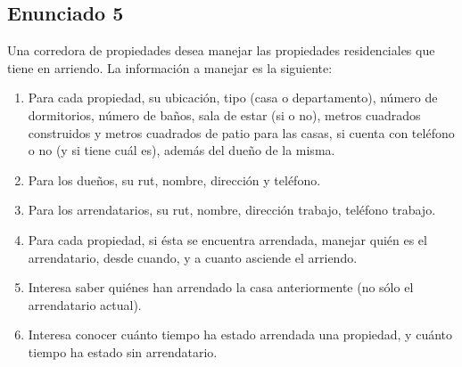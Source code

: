 \documentclass{templateNote}
\begin{document}
\subsection{Enunciado 5}
Una corredora de propiedades desea manejar las propiedades residenciales que tiene en arriendo.
La información a manejar es la siguiente:
\begin{enumerate}
    \item Para cada propiedad, su ubicación, tipo (casa o departamento), número de dormitorios, número
    de baños, sala de estar (si o no), metros cuadrados construidos y metros cuadrados de patio para
    las casas, si cuenta con teléfono o no (y si tiene cuál es), además del dueño de la misma.
    \item Para los dueños, su rut, nombre, dirección y teléfono.
    \item Para los arrendatarios, su rut, nombre, dirección trabajo, teléfono trabajo.
    \item Para cada propiedad, si ésta se encuentra arrendada, manejar quién es el arrendatario, desde
    cuando, y a cuanto asciende el arriendo.
    \item Interesa saber quiénes han arrendado la casa anteriormente (no sólo el arrendatario actual).
    \item Interesa conocer cuánto tiempo ha estado arrendada una propiedad, y cuánto tiempo ha estado
    sin arrendatario.
\end{enumerate}

\end{document}
